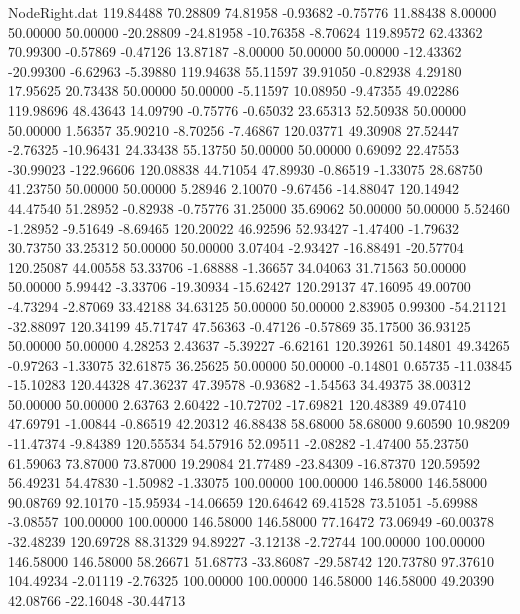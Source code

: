 \begin{filecontents}{NodeRight.dat}
 119.84488   70.28809   74.81958    -0.93682   -0.75776   11.88438    8.00000   50.00000   50.00000  -20.28809  -24.81958  -10.76358   -8.70624
 119.89572   62.43362   70.99300    -0.57869   -0.47126   13.87187   -8.00000   50.00000   50.00000  -12.43362  -20.99300   -6.62963   -5.39880
 119.94638   55.11597   39.91050    -0.82938    4.29180   17.95625   20.73438   50.00000   50.00000   -5.11597   10.08950   -9.47355   49.02286
 119.98696   48.43643   14.09790    -0.75776   -0.65032   23.65313   52.50938   50.00000   50.00000    1.56357   35.90210   -8.70256   -7.46867
 120.03771   49.30908   27.52447    -2.76325  -10.96431   24.33438   55.13750   50.00000   50.00000    0.69092   22.47553  -30.99023 -122.96606
 120.08838   44.71054   47.89930    -0.86519   -1.33075   28.68750   41.23750   50.00000   50.00000    5.28946    2.10070   -9.67456  -14.88047
 120.14942   44.47540   51.28952    -0.82938   -0.75776   31.25000   35.69062   50.00000   50.00000    5.52460   -1.28952   -9.51649   -8.69465
 120.20022   46.92596   52.93427    -1.47400   -1.79632   30.73750   33.25312   50.00000   50.00000    3.07404   -2.93427  -16.88491  -20.57704
 120.25087   44.00558   53.33706    -1.68888   -1.36657   34.04063   31.71563   50.00000   50.00000    5.99442   -3.33706  -19.30934  -15.62427
 120.29137   47.16095   49.00700    -4.73294   -2.87069   33.42188   34.63125   50.00000   50.00000    2.83905    0.99300  -54.21121  -32.88097
 120.34199   45.71747   47.56363    -0.47126   -0.57869   35.17500   36.93125   50.00000   50.00000    4.28253    2.43637   -5.39227   -6.62161
 120.39261   50.14801   49.34265    -0.97263   -1.33075   32.61875   36.25625   50.00000   50.00000   -0.14801    0.65735  -11.03845  -15.10283
 120.44328   47.36237   47.39578    -0.93682   -1.54563   34.49375   38.00312   50.00000   50.00000    2.63763    2.60422  -10.72702  -17.69821
 120.48389   49.07410   47.69791    -1.00844   -0.86519   42.20312   46.88438   58.68000   58.68000    9.60590   10.98209  -11.47374   -9.84389
 120.55534   54.57916   52.09511    -2.08282   -1.47400   55.23750   61.59063   73.87000   73.87000   19.29084   21.77489  -23.84309  -16.87370
 120.59592   56.49231   54.47830    -1.50982   -1.33075  100.00000  100.00000  146.58000  146.58000   90.08769   92.10170  -15.95934  -14.06659
 120.64642   69.41528   73.51051    -5.69988   -3.08557  100.00000  100.00000  146.58000  146.58000   77.16472   73.06949  -60.00378  -32.48239
 120.69728   88.31329   94.89227    -3.12138   -2.72744  100.00000  100.00000  146.58000  146.58000   58.26671   51.68773  -33.86087  -29.58742
 120.73780   97.37610  104.49234    -2.01119   -2.76325  100.00000  100.00000  146.58000  146.58000   49.20390   42.08766  -22.16048  -30.44713

\end{filecontents}
